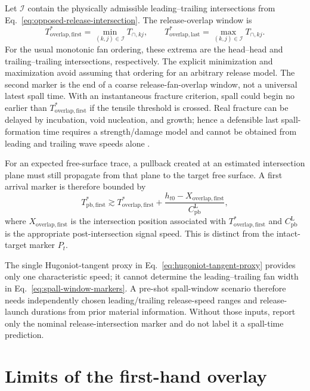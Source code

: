 \documentclass[11pt]{article}
\newcommand{\Pt}{P_t}
\begin{document}
Let $\mathcal I$ contain the physically admissible leading--trailing
intersections from Eq.~\eqref{eq:opposed-release-intersection}.  The
release-overlap window is
\begin{equation}
  T_{\mathrm{overlap,first}}^{\ast}
  =\min_{(k,j)\in\mathcal I}T_{\cap,kj},
  \qquad
  T_{\mathrm{overlap,last}}^{\ast}
  =\max_{(k,j)\in\mathcal I}T_{\cap,kj}.
  \label{eq:spall-window-markers}
\end{equation}
For the usual monotonic fan ordering, these extrema are the head--head and
trailing--trailing intersections, respectively.  The explicit minimization
and maximization avoid assuming that ordering for an arbitrary release model.
The second marker is the end of a coarse release-fan-overlap window, not a
universal latest spall time.  With an instantaneous fracture criterion, spall
could begin no earlier than $T_{\mathrm{overlap,first}}^{\ast}$ if the tensile
threshold is crossed.  Real fracture can be delayed by incubation, void
nucleation, and growth; hence a defensible last spall-formation time requires
a strength/damage model and cannot be obtained from leading and trailing wave
speeds alone \cite{Hawkins2020}.

For an expected free-surface trace, a pullback created at an estimated
intersection plane must still propagate from that plane to the target free
surface.  A first arrival marker is therefore bounded by
\begin{equation}
  T_{\mathrm{pb,first}}^{\ast}\gtrsim
  T_{\mathrm{overlap,first}}^{\ast}
  +\frac{h_{t0}-X_{\mathrm{overlap,first}}}
         {C_{\mathrm{pb}}^{\mathrm L}},
  \label{eq:pullback-first-arrival}
\end{equation}
where $X_{\mathrm{overlap,first}}$ is the intersection position associated
with $T_{\mathrm{overlap,first}}^{\ast}$ and
$C_{\mathrm{pb}}^{\mathrm L}$ is the appropriate post-intersection signal
speed.  This is distinct from the
intact-target marker $\Pt$.

The single Hugoniot-tangent proxy in
Eq.~\eqref{eq:hugoniot-tangent-proxy} provides only one characteristic speed;
it cannot determine the leading--trailing fan width in
Eq.~\eqref{eq:spall-window-markers}.  A pre-shot spall-window scenario
therefore needs independently chosen leading/trailing release-speed ranges
and release-launch durations from prior material information.  Without those
inputs, report only the nominal release-intersection marker and do not label
it a spall-time prediction.

\section{Limits of the first-hand overlay}
\end{document}
